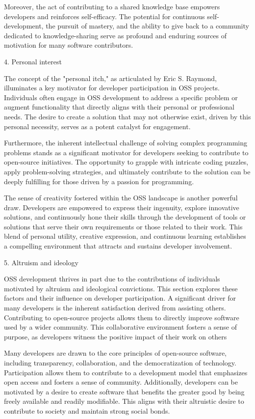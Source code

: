 Moreover, the act of contributing to a shared knowledge base empowers developers and reinforces self-efficacy. The potential for continuous self-development, the pursuit of mastery, and the ability to give back to a community dedicated to knowledge-sharing serve as profound and enduring sources of motivation for many software contributors.

4. Personal interest

The concept of the "personal itch," as articulated by Eric S. Raymond, illuminates a key motivator for developer participation in OSS projects. Individuals often engage in OSS development to address a specific problem or augment functionality that directly aligns with their personal or professional needs. The desire to create a solution that may not otherwise exist, driven by this personal necessity, serves as a potent catalyst for engagement.

Furthermore, the inherent intellectual challenge of solving complex programming problems stands as a significant motivator for developers seeking to contribute to open-source initiatives. The opportunity to grapple with intricate coding puzzles, apply problem-solving strategies, and ultimately contribute to the solution can be deeply fulfilling for those driven by a passion for programming.

The sense of creativity fostered within the OSS landscape is another powerful draw. Developers are empowered to express their ingenuity, explore innovative solutions, and continuously hone their skills through the development of tools or solutions that serve their own requirements or those related to their work. This blend of personal utility, creative expression, and continuous learning establishes a compelling environment that attracts and sustains developer involvement.

5. Altruism and ideology

OSS development thrives in part due to the contributions of individuals motivated by altruism and ideological convictions. This section explores these factors and their influence on developer participation. A significant driver for many developers is the inherent satisfaction derived from assisting others. Contributing to open-source projects allows them to directly improve software used by a wider community. This collaborative environment fosters a sense of purpose, as developers witness the positive impact of their work on others

Many developers are drawn to  the core principles of open-source software, including transparency, collaboration, and the democratization of technology. Participation allows them to contribute to a development model that emphasizes open access and fosters a sense of community.  Additionally, developers can be motivated by a desire to create software that benefits the greater good by being freely available and readily modifiable. This aligns with their altruistic desire to contribute to society and maintain strong social bonds.

